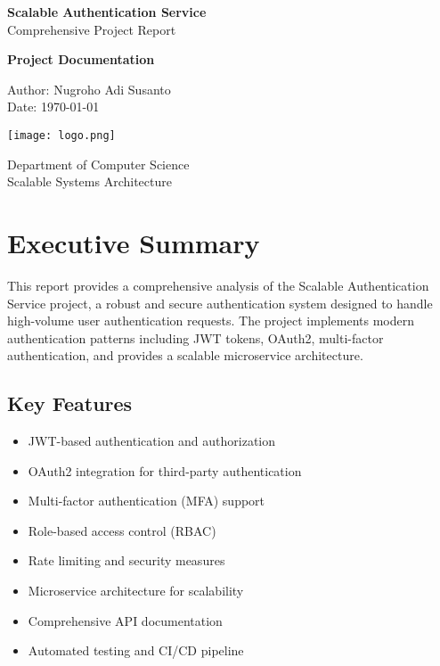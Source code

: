 \documentclass[12pt,a4paper]{article}
\begin{document}
\begin{titlepage}
    \centering
    \vspace*{2cm}
    
    {\huge\bfseries Scalable Authentication Service}\\
    \vspace{0.5cm}
    {\Large Comprehensive Project Report}\\
    \vspace{2cm}
    
    {\large\bfseries Project Documentation}\\
    \vspace{1cm}
    
    {\large Author: Nugroho Adi Susanto}\\
    \vspace{0.5cm}
    {\large Date: \today}\\
    \vspace{2cm}
    
    \texttt{[image: logo.png]}\\
    \vspace{1cm}
    
    {\large Department of Computer Science}\\
    {\large Scalable Systems Architecture}\\
    
    \vfill
\end{titlepage}

\tableofcontents
\newpage

\section{Executive Summary}

This report provides a comprehensive analysis of the Scalable Authentication Service project, a robust and secure authentication system designed to handle high-volume user authentication requests. The project implements modern authentication patterns including JWT tokens, OAuth2, multi-factor authentication, and provides a scalable microservice architecture.

\subsection{Key Features}
\begin{itemize}
    \item JWT-based authentication and authorization
    \item OAuth2 integration for third-party authentication
    \item Multi-factor authentication (MFA) support
    \item Role-based access control (RBAC)
    \item Rate limiting and security measures
    \item Microservice architecture for scalability
    \item Comprehensive API documentation
    \item Automated testing and CI/CD pipeline
\end{itemize}
\end{document}
